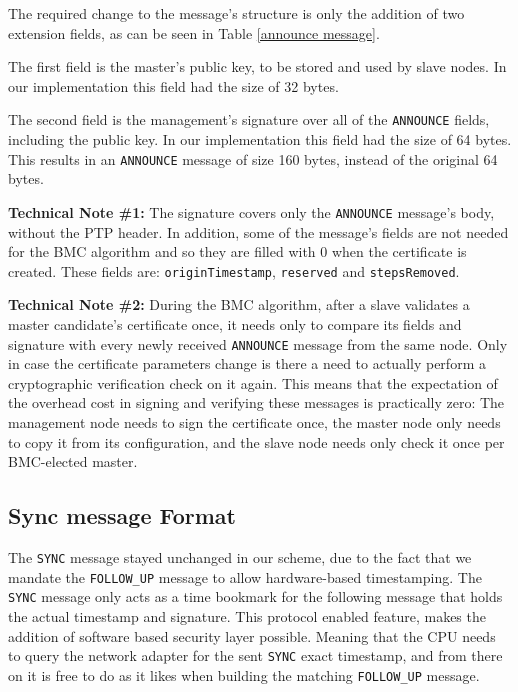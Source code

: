 \documentclass[11pt]{article}
\begin{document}
The required change to the message's structure is only the addition of two extension fields, as can be seen in Table \ref{announce message}.

The first field is the master's public key, to be stored and used by slave nodes. In our implementation this field had the size of 32 bytes.

The second field is the management's signature over all of the \texttt{ANNOUNCE} fields, including the public key. In our implementation this field had the size of 64 bytes. This results in an \texttt{ANNOUNCE} message of size 160 bytes, instead of the original 64 bytes.



\textbf{Technical Note \#1:} The signature covers only the \texttt{ANNOUNCE} message's body, without the PTP header. In addition, some of the message's fields are not needed for the BMC algorithm and so they are filled with 0 when the certificate is created. These fields are: \texttt{originTimestamp}, \texttt{reserved} and \texttt{stepsRemoved}.



\textbf{Technical Note \#2:} During the BMC algorithm, after a slave validates a master candidate's certificate once, it needs only to compare its fields and signature with every newly received \texttt{ANNOUNCE} message from the same node. Only in case the certificate parameters change is there a need to actually perform a cryptographic verification check on it again. This means that the expectation of the overhead cost in signing and verifying these messages is practically zero: The management node needs to sign the certificate once, the master node only needs to copy it from its configuration, and the slave node needs only check it once per BMC-elected master.



\subsection{Sync message Format}\label{sol:sync}

The \texttt{SYNC} message stayed unchanged in our scheme, due to the fact that we mandate the \texttt{FOLLOW_UP} message to allow hardware-based timestamping. The \texttt{SYNC} message only acts as a time bookmark for the following message that holds the actual timestamp and signature. This protocol enabled feature, makes the addition of software based security layer possible. Meaning that the CPU needs to query the network adapter for the sent \texttt{SYNC} exact timestamp, and from there on it is free to do as it likes when building the matching \texttt{FOLLOW_UP} message.
\end{document}
